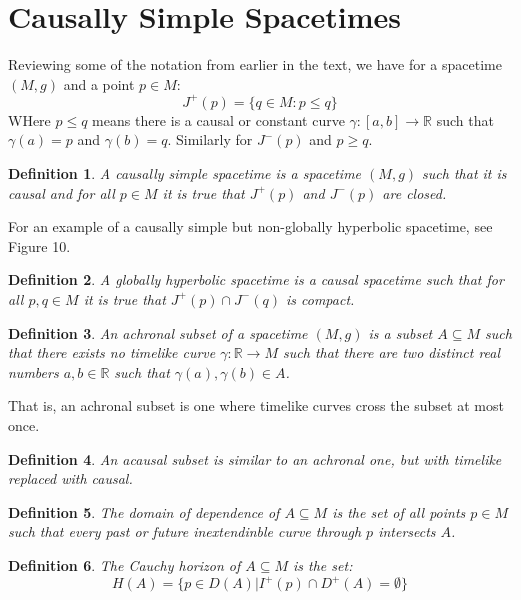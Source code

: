 \documentclass{article}
\theoremstyle{plain}
\theoremstyle{thmit}
\theoremstyle{normal}
\newtheorem{definition}{Definition}[section]
\begin{document}
    \section{Causally Simple Spacetimes}
        Reviewing some of the notation from earlier in the text, we have for a
        spacetime $(M,g)$ and a point $p\in{M}$:
        \begin{equation}
            J^{+}(p)=\{q\in{M}:p\leq{q}\}
        \end{equation}
        WHere $p\leq{q}$ means there is a causal or constant curve
        $\gamma:[a,b]\rightarrow\mathbb{R}$ such that $\gamma(a)=p$ and
        $\gamma(b)=q$. Similarly for $J^{-}(p)$ and $p\geq{q}$.
        \begin{definition}
            A causally simple spacetime is a spacetime $(M,g)$ such that
            it is causal and for all $p\in{M}$ it is true that
            $J^{+}(p)$ and $J^{-}(p)$ are closed.
        \end{definition}
        For an example of a causally simple but non-globally hyperbolic
        spacetime, see Figure 10.
        \begin{definition}
            A globally hyperbolic spacetime is a causal spacetime such that for
            all $p,q\in{M}$ it is true that $J^{+}(p)\cap{J}^{-}(q)$ is compact.
        \end{definition}
        \begin{definition}
            An achronal subset of a spacetime $(M,g)$ is a subset
            $A\subseteq{M}$ such that there exists no timelike curve
            $\gamma:\mathbb{R}\rightarrow{M}$ such that there are two distinct
            real numbers $a,b\in\mathbb{R}$ such that
            $\gamma(a),\gamma(b)\in{A}$.
        \end{definition}
        That is, an achronal subset is one where timelike curves cross the
        subset at most once.
        \begin{definition}
            An acausal subset is similar to an achronal one, but with timelike
            replaced with causal.
        \end{definition}
        \begin{definition}
            The domain of dependence of $A\subseteq{M}$ is the set of all points
            $p\in{M}$ such that every past or future inextendinble curve through
            $p$ intersects $A$.
        \end{definition}
        \begin{definition}
            The Cauchy horizon of $A\subseteq{M}$ is the set:
            \begin{equation}
                H(A)=\{p\in{D}(A)|I^{+}(p)\cap{D}^{+}(A)=\emptyset\}
            \end{equation}
        \end{definition}
\end{document}
